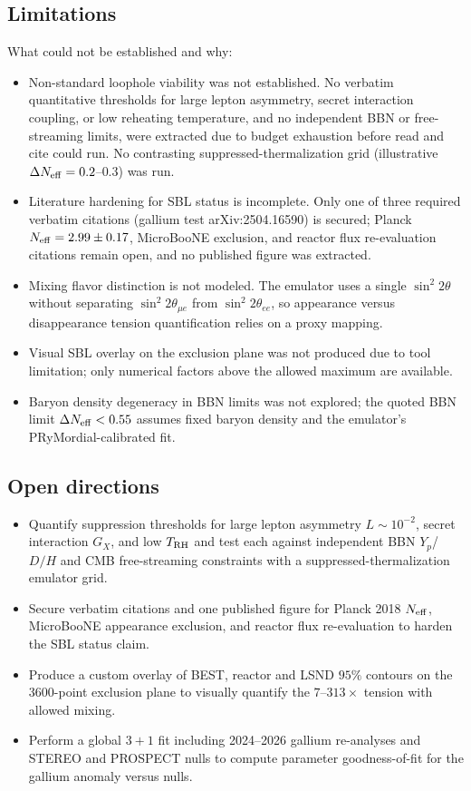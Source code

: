 \documentclass[11pt,a4paper]{article}
\begin{document}
\subsection{Limitations}
What could not be established and why:

\begin{itemize}
  \item Non-standard loophole viability was not established. No verbatim quantitative thresholds for large lepton asymmetry, secret interaction coupling, or low reheating temperature, and no independent BBN or free-streaming limits, were extracted due to budget exhaustion before read and cite could run. No contrasting suppressed-thermalization grid (illustrative $\Delta N_{\rm eff} = 0.2$--$0.3$) was run.
  \item Literature hardening for SBL status is incomplete. Only one of three required verbatim citations (gallium test arXiv:2504.16590) is secured; Planck $N_{\rm eff} = 2.99 \pm 0.17$, MicroBooNE exclusion, and reactor flux re-evaluation citations remain open, and no published figure was extracted.
  \item Mixing flavor distinction is not modeled. The emulator uses a single $\sin^2 2\theta$ without separating $\sin^2 2\theta_{\mu e}$ from $\sin^2 2\theta_{ee}$, so appearance versus disappearance tension quantification relies on a proxy mapping.
  \item Visual SBL overlay on the exclusion plane was not produced due to tool limitation; only numerical factors above the allowed maximum are available.
  \item Baryon density degeneracy in BBN limits was not explored; the quoted BBN limit $\Delta N_{\rm eff} < 0.55$ assumes fixed baryon density and the emulator's PRyMordial-calibrated fit.
\end{itemize}
\subsection{Open directions}
\begin{itemize}
  \item Quantify suppression thresholds for large lepton asymmetry $L \sim 10^{-2}$, secret interaction $G_X$, and low $T_{\rm RH}$ and test each against independent BBN $Y_p$/$D/H$ and CMB free-streaming constraints with a suppressed-thermalization emulator grid.
  \item Secure verbatim citations and one published figure for Planck 2018 $N_{\rm eff}$, MicroBooNE appearance exclusion, and reactor flux re-evaluation to harden the SBL status claim.
  \item Produce a custom overlay of BEST, reactor and LSND $95\%$ contours on the 3600-point exclusion plane to visually quantify the $7$--$313\times$ tension with allowed mixing.
  \item Perform a global $3+1$ fit including 2024--2026 gallium re-analyses and STEREO and PROSPECT nulls to compute parameter goodness-of-fit for the gallium anomaly versus nulls.
\end{itemize}
\end{document}
